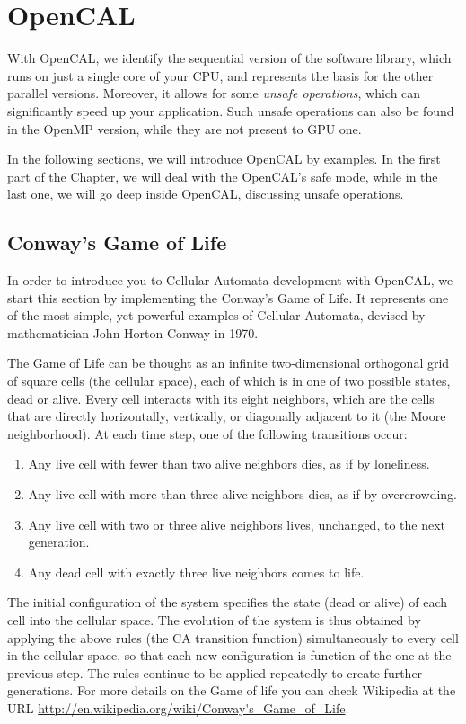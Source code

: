 \chapter{OpenCAL}

With OpenCAL, we identify the sequential version of the software
library, which runs on just a single core of your CPU, and represents
the basis for the other parallel versions. Moreover, it allows for
some \emph{unsafe operations}, which can significantly speed up your
application. Such unsafe operations can also be found in the OpenMP
version, while they are not present to GPU one.

In the following sections, we will introduce OpenCAL by examples. In
the first part of the Chapter, we will deal with the OpenCAL's safe
mode, while in the last one, we will go deep inside OpenCAL,
discussing unsafe operations.

\section{Conway's Game of Life}

In order to introduce you to Cellular Automata development with
OpenCAL, we start this section by implementing the Conway's Game of
Life. It represents one of the most simple, yet powerful examples of
Cellular Automata, devised by mathematician John Horton Conway in
1970.

The Game of Life can be thought as an infinite two-dimensional
orthogonal grid of square cells (the cellular space), each of which is
in one of two possible states, dead or alive. Every cell interacts
with its eight neighbors, which are the cells that are directly
horizontally, vertically, or diagonally adjacent to it (the Moore
neighborhood). At each time step, one of the following transitions
occur:

\begin{enumerate}
    \item Any live cell with fewer than two alive neighbors dies, as
      if by loneliness.
    \item Any live cell with more than three alive neighbors dies, as
      if by overcrowding.
    \item Any live cell with two or three alive neighbors lives,
      unchanged, to the next generation.
    \item Any dead cell with exactly three live neighbors comes to
      life.
\end{enumerate}

The initial configuration of the system specifies the state (dead or
alive) of each cell into the cellular space. The evolution of the
system is thus obtained by applying the above rules (the CA transition
function) simultaneously to every cell in the cellular space, so that
each new configuration is function of the one at the previous
step. The rules continue to be applied repeatedly to create further
generations. For more details on the Game of life you can check
Wikipedia at the URL
\url{http://en.wikipedia.org/wiki/Conway's_Game_of_Life}.

